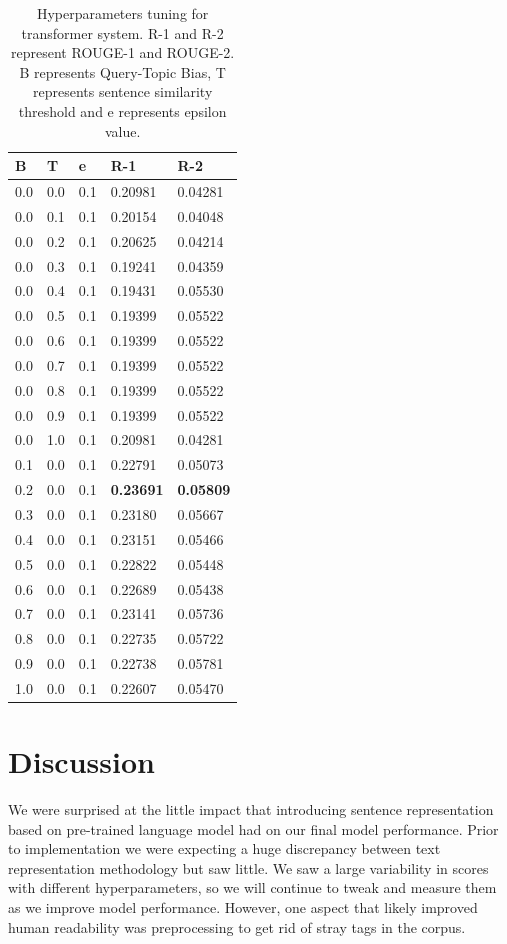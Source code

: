 \documentclass[11pt,a4paper]{article}
\begin{document}
\begin{table}[h]
\centering
\begin{tabular}{|l|l|l|l|l|} \hline \textbf{B} & \textbf{T} & \textbf{e} & \textbf{R-1} & \textbf{R-2}\\ \hline
 0.0 & 0.0 & 0.1 & 0.20981 & 0.04281 \\ \hline
 0.0 & 0.1 & 0.1 & 0.20154 & 0.04048 \\ \hline
 0.0 & 0.2 & 0.1 & 0.20625 & 0.04214 \\ \hline
 0.0 & 0.3 & 0.1 & 0.19241 & 0.04359 \\ \hline
 0.0 & 0.4 & 0.1 & 0.19431 & 0.05530 \\ \hline
 0.0 & 0.5 & 0.1 & 0.19399 & 0.05522 \\ \hline
 0.0 & 0.6 & 0.1 & 0.19399 & 0.05522 \\ \hline
 0.0 & 0.7 & 0.1 & 0.19399 & 0.05522\\ \hline
 0.0 & 0.8 & 0.1 & 0.19399 & 0.05522 \\ \hline
 0.0 & 0.9 & 0.1 & 0.19399 & 0.05522 \\ \hline
 0.0 & 1.0 & 0.1 & 0.20981 & 0.04281 \\ \hline
 0.1 & 0.0 & 0.1 & 0.22791 & 0.05073 \\ \hline
 0.2 & 0.0 & 0.1 & \textbf{0.23691} &\textbf{0.05809} \\ \hline
 0.3 & 0.0 & 0.1 & 0.23180 & 0.05667 \\ \hline
 0.4 & 0.0 & 0.1 & 0.23151 & 0.05466 \\ \hline
 0.5 & 0.0 & 0.1 & 0.22822 & 0.05448 \\ \hline
 0.6 & 0.0 & 0.1 & 0.22689 & 0.05438 \\ \hline
 0.7 & 0.0 & 0.1 & 0.23141 & 0.05736 \\ \hline
 0.8 & 0.0 & 0.1 & 0.22735 & 0.05722 \\ \hline
 0.9 & 0.0 & 0.1 & 0.22738 & 0.05781 \\ \hline
 1.0 & 0.0 & 0.1 & 0.22607 & 0.05470 \\ \hline
\end{tabular}
\label{table:2}
\caption{Hyperparameters tuning for transformer system. R-1 and R-2 represent ROUGE-1 and ROUGE-2. B represents Query-Topic Bias, T represents sentence similarity threshold and e represents epsilon value.}
\end{table}

\section{Discussion}
We were surprised at the little impact that introducing sentence representation based on pre-trained language model had on our final model performance. Prior to implementation we were expecting a huge discrepancy between text representation methodology but saw little. We saw a large variability in scores with different hyperparameters, so we will continue to tweak and measure them as we improve model performance. However, one aspect that likely improved human readability was preprocessing to get rid of stray tags in the corpus.
\end{document}
